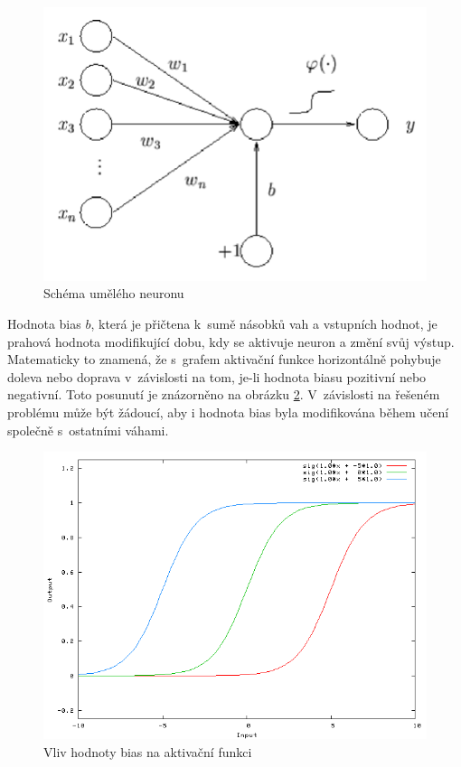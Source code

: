 \begin{figure}[H]
    \centering
    \includegraphics[scale=0.35]{obrazky-figures/perceptron.png}
    \caption{\label{fig:neuron}Schéma umělého neuronu}
\end{figure}

Hodnota bias $b$, která je přičtena k~sumě násobků vah a vstupních hodnot, je prahová hodnota modifikující dobu, kdy se aktivuje neuron a změní svůj výstup. Matematicky to znamená, že s~grafem aktivační funkce horizontálně pohybuje doleva nebo doprava v~závislosti na tom, je-li hodnota biasu pozitivní nebo negativní. Toto posunutí je znázorněno na obrázku \ref{fig:bias}. V~závislosti na řešeném problému může být žádoucí, aby i hodnota bias byla modifikována během učení společně s~ostatními váhami.

\begin{figure}[H]
    \centering
    \includegraphics[scale=0.4]{obrazky-figures/bias.png}
    \caption{\label{fig:bias}Vliv hodnoty bias na aktivační funkci}
\end{figure}




